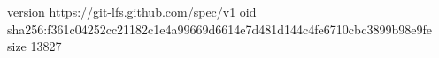 version https://git-lfs.github.com/spec/v1
oid sha256:f361c04252cc21182c1e4a99669d6614e7d481d144c4fe6710cbc3899b98e9fe
size 13827
